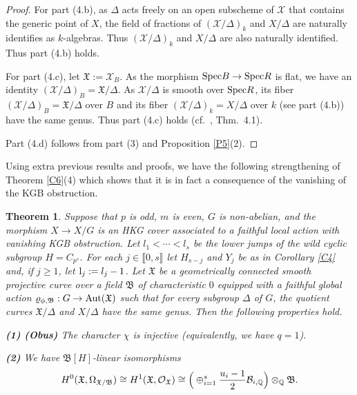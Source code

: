 \documentclass[11pt]{amsart}
\newtheorem{theorem}{Theorem}[section]
\def\Aut{\textup{Aut}}
\def\l{\textup{l}}
\def\Spec{\textup{Spec}}
\begin{document}
\begin{proof}
For part (4.b), as $\Delta$ acts freely on an open subscheme of $\mathcal X$ that contains the generic point of $X$, the field of fractions of $(\mathcal X/\Delta)_k$ and $X/\Delta$ are naturally identifies as $k$-algebras. Thus $(\mathcal X/\Delta)_k$ and $X/\Delta$ are also naturally identified. Thus part (4.b) holds.

For part (4.c), let $\mathfrak X:=\mathcal X_B$. As the morphism $\Spec B\rightarrow\Spec R$ is flat, we have an identity $(\mathcal X/\Delta)_B=\mathfrak X/\Delta$. As $\mathcal X/\Delta$ is smooth over $\Spec R$, its fiber $(\mathcal X/\Delta)_B=\mathfrak X/\Delta$ over $B$ and its fiber $(\mathcal X/\Delta)_k=X/\Delta$ over $k$ (see part (4.b)) have the same genus. Thus part (4.c) holds (cf.\ \cite{CGH2}, Thm.\ 4.1).

Part (4.d) follows from part (3) and Proposition \ref{P5}(2).
\end{proof}

\smallskip
Using extra previous results and proofs, we have the following strengthening of Theorem \ref{C6}(4) which shows that it is in fact a consequence of the vanishing of the KGB obstruction.

\begin{theorem}\label{C7}
Suppose that $p$ is odd, $m$ is even, $G$ is non-abelian, and the morphism $X\rightarrow X/G$ is an HKG cover associated to a faithful local action with vanishing KGB obstruction. Let
$l_1<\cdots<l_s$ be the lower jumps of the wild cyclic subgroup $H=C_{p^s}$. For each $j\in\llbracket0,s\rrbracket$ let $H_{s-j}$ and $Y_j$ be as in Corollary \ref{C4} and, if $j\ge 1$, let $\l_j:=l_j-1$. Let $\mathfrak X$ be a geometrically connected smooth projective curve over a field $\mathfrak B$ of characteristic $0$ equipped with a faithful global action $\varrho_{\phi,\mathfrak B}:G\rightarrow\Aut(\mathfrak X)$ such that for every subgroup $\Delta$ of $G$, the quotient curves $\mathfrak X/\Delta$ and $X/\Delta$ have the same genus. Then the following properties hold.

\medskip
{\bf (1) (Obus)} The character $\chi$ is injective (equivalently, we have $q=1$). 

\smallskip
{\bf (2)} We have
$\mathfrak B[H]$-linear isomorphisms
\begin{equation*}
H^0(\mathfrak X,\Omega_{\mathfrak X/\mathfrak B})\cong H^1(\mathfrak X,\mathcal O_{\mathfrak X})\\
\cong
\Big(\oplus_{i=1}^s
\frac{u_i-1}{2}\mathcal B_{i,\mathbb Q}
\Big)\otimes_{\mathbb Q}\mathfrak B.
\end{equation*}
\end{theorem}
\end{document}
